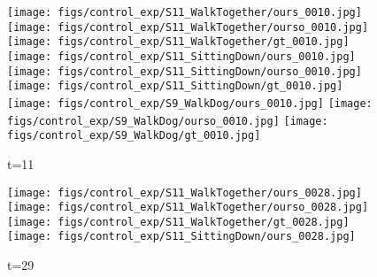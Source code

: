 \documentclass{article}
\begin{document}
\begin{appendix}
\begin{figure*}[!thbp]
    \centering
    \vspace{60pt}
	\begin{subfigure}{0.04\linewidth}
        \raggedleft
    \end{subfigure}
    \begin{subfigure}{0.12\linewidth}
        \caption*{t=11}
        \vspace{-7pt}
	    \texttt{[image: figs/control\_exp/S11\_WalkTogether/ours\_0010.jpg]}
	    \texttt{[image: figs/control\_exp/S11\_WalkTogether/ourso\_0010.jpg]}
	    \vspace{.2cm}
  		\texttt{[image: figs/control\_exp/S11\_WalkTogether/gt\_0010.jpg]}
  		\texttt{[image: figs/control\_exp/S11\_SittingDown/ours\_0010.jpg]}
  		\texttt{[image: figs/control\_exp/S11\_SittingDown/ourso\_0010.jpg]}
  		\vspace{.2cm}
  		\texttt{[image: figs/control\_exp/S11\_SittingDown/gt\_0010.jpg]}
  		\texttt{[image: figs/control\_exp/S9\_WalkDog/ours\_0010.jpg]}
  		\texttt{[image: figs/control\_exp/S9\_WalkDog/ourso\_0010.jpg]}
  		\vspace{.2cm}
  		\texttt{[image: figs/control\_exp/S9\_WalkDog/gt\_0010.jpg]}
	\end{subfigure} 
    \begin{subfigure}{0.12\linewidth}
        \caption*{t=29}
        \vspace{-7pt}
	    \texttt{[image: figs/control\_exp/S11\_WalkTogether/ours\_0028.jpg]}
	    \texttt{[image: figs/control\_exp/S11\_WalkTogether/ourso\_0028.jpg]}
	    \vspace{.2cm}
  		\texttt{[image: figs/control\_exp/S11\_WalkTogether/gt\_0028.jpg]}
  		\texttt{[image: figs/control\_exp/S11\_SittingDown/ours\_0028.jpg]}

\end{subfigure}
\end{figure*}
\end{appendix}
\end{document}
